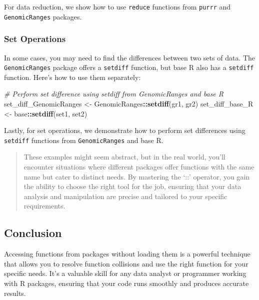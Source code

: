 \documentclass[
]{book}
\newenvironment{Shaded}{\begin{snugshade}}{\end{snugshade}}
\newcommand{\CommentTok}[1]{\textcolor[rgb]{0.56,0.35,0.01}{\textit{#1}}}
\newcommand{\FunctionTok}[1]{\textcolor[rgb]{0.13,0.29,0.53}{\textbf{#1}}}
\newcommand{\NormalTok}[1]{#1}
\newcommand{\OtherTok}[1]{\textcolor[rgb]{0.56,0.35,0.01}{#1}}
\newcommand{\SpecialCharTok}[1]{\textcolor[rgb]{0.81,0.36,0.00}{\textbf{#1}}}
\begin{document}
For data reduction, we show how to use \texttt{reduce} functions from \texttt{purrr} and \texttt{GenomicRanges} packages.

\hypertarget{set-operations}{%
\subsubsection{Set Operations}\label{set-operations}}

In some cases, you may need to find the differences between two sets of data. The \texttt{GenomicRanges} package offers a \texttt{setdiff} function, but base R also has a \texttt{setdiff} function. Here's how to use them separately:

\begin{Shaded}
\begin{Highlighting}[]
\CommentTok{\# Perform set difference using \textquotesingle{}setdiff\textquotesingle{} from \textquotesingle{}GenomicRanges\textquotesingle{} and base R}
\NormalTok{set\_diff\_GenomicRanges }\OtherTok{\textless{}{-}}\NormalTok{ GenomicRanges}\SpecialCharTok{::}\FunctionTok{setdiff}\NormalTok{(gr1, gr2)}
\NormalTok{set\_diff\_base\_R }\OtherTok{\textless{}{-}}\NormalTok{ base}\SpecialCharTok{::}\FunctionTok{setdiff}\NormalTok{(set1, set2)}
\end{Highlighting}
\end{Shaded}

Lastly, for set operations, we demonstrate how to perform set differences using \texttt{setdiff} functions from \texttt{GenomicRanges} and base R.

\begin{quote}
These examples might seem abstract, but in the real world, you'll encounter situations where different packages offer functions with the same name but cater to distinct needs. By mastering the `::' operator, you gain the ability to choose the right tool for the job, ensuring that your data analysis and manipulation are precise and tailored to your specific requirements.
\end{quote}

\hypertarget{conclusion-12}{%
\subsection{Conclusion}\label{conclusion-12}}

Accessing functions from packages without loading them is a powerful technique that allows you to resolve function collisions and use the right function for your specific needs. It's a valuable skill for any data analyst or programmer working with R packages, ensuring that your code runs smoothly and produces accurate results.
\end{document}
